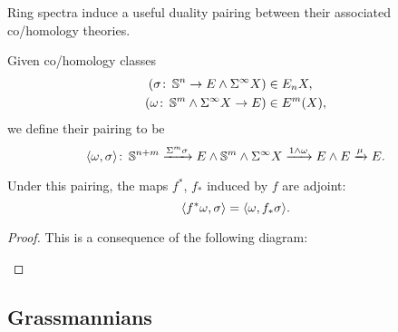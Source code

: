 Ring spectra induce a useful duality pairing between their associated co/homology theories.
\begin{definition}
Given co/homology classes
\begin{align*}
(\sigma\colon\thinspace \mathbb S^n \to E \wedge \Sigma^\infty X) & \in E_n X, \\
(\omega \colon\thinspace \mathbb S^m \wedge \Sigma^\infty X \to E) & \in E^m(X),
\end{align*}
we define their pairing to be \[\langle\omega, \sigma\rangle\colon\thinspace \mathbb S^{n+m} \xrightarrow{\Sigma^m \sigma} E \wedge \mathbb S^m \wedge \Sigma^\infty X \xrightarrow{1 \wedge \omega} E \wedge E \xrightarrow\mu E.\]
\end{definition}

\begin{lemma}
Under this pairing, the maps $f^*$, $f_*$ induced by $f$ are adjoint: \[\langle f^* \omega, \sigma\rangle = \langle\omega, f_* \sigma\rangle.\]
\end{lemma}
\begin{proof}
This is a consequence of the following diagram:
\begin{center}
\end{center}
\end{proof}



\begin{subappendices}

\section{Grassmannians}

\end{subappendices}
